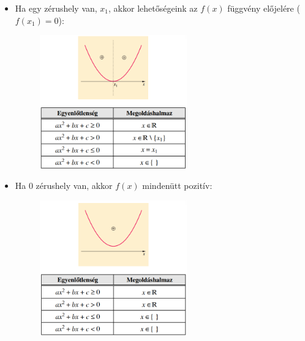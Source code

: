 \documentclass[12pt,a4paper]{article}
\begin{document}
\begin{enumerate}
\begin{itemize}
\item Ha egy zérushely van, $x_1$, akkor lehetőségeink az $f(x)$ függvény előjelére ($f(x_1) = 0$):
\begin{figure}[h]
\centering
\includegraphics[width=0.6\textwidth]{masodfoku_egyenlotlenseg_2}
\end{figure}

\item Ha 0 zérushely van, akkor $f(x)$ mindenütt pozitív:
\begin{figure}[h]
\centering
\includegraphics[width=0.6\textwidth]{masodfoku_egyenlotlenseg_3}
\end{figure}
\end{itemize}
\end{enumerate}
\newpage
\end{document}
